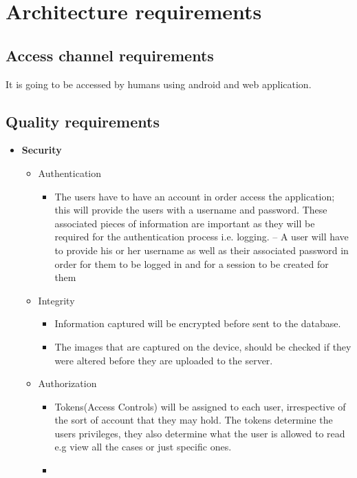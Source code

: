 \documentclass[10pt,a4paper]{article}
\begin{document}
\pagebreak
\section{Architecture requirements}
\subsection{Access channel requirements}
\indent It is going to be accessed by humans using android and web application.
                                                                                               
\subsection{Quality requirements}
\begin{itemize}
\item\textbf{Security}
\begin{itemize}
	\item Authentication
	\begin{itemize}
		\item The users have to have an account in order access the application; this will
		provide the users with a username and password. These associated pieces
		of information are important as they will be required for the authentication
		process i.e. logging.
		– A user will have to provide his or her username as well as their
		associated password in order for them to be logged in and for a session
		to be created for them
	\end{itemize}
	\item Integrity
	\begin{itemize}
		\item Information captured will be encrypted before sent to the database.
		\item The images that are captured on the device, should be checked if they were altered before they are uploaded to the server.
	\end{itemize}
		\item Authorization
		\begin{itemize}
			\item Tokens(Access Controls) will be assigned to each user, irrespective of the sort of account that they may hold. The tokens determine the users privileges, they also determine what the user is allowed to read e.g view all the cases or just specific ones.
			\item 
			\begin{tabular}{|l|l|}\hline

\end{tabular}
\end{itemize}
\end{itemize}
\end{itemize}
\end{document}
